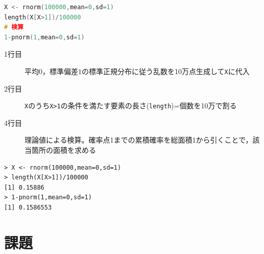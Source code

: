 \documentclass{ltjsarticle}
\begin{document}
\begin{lstlisting}[language=c++]
X <- rnorm(100000,mean=0,sd=1)
length(X[X>1])/100000
# 検算
1-pnorm(1,mean=0,sd=1)
\end{lstlisting}
\begin{description}
        \item[1行目] 平均$0$，標準偏差$1$の標準正規分布に従う乱数を10万点生成して\texttt{X}に代入
        \item[2行目] \texttt{X}のうち\texttt{X>1}の条件を満たす要素の長さ(\texttt{length})=個数を10万で割る
        \item[4行目] 理論値による検算。確率点1までの累積確率を総面積1から引くことで，該当箇所の面積を求める
    \end{description}

\begin{tcolorbox}
\begin{verbatim}
> X <- rnorm(100000,mean=0,sd=1)
> length(X[X>1])/100000
[1] 0.15886
> 1-pnorm(1,mean=0,sd=1)
[1] 0.1586553\end{verbatim}
\end{tcolorbox}
\section{課題}
\end{document}
